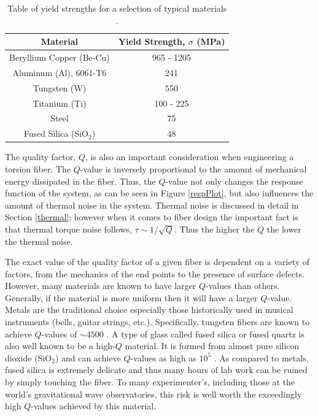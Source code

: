 \documentclass{book}
\begin{document}
\begin{center}		
	\begingroup
	\setlength{\tabcolsep}{10pt} %
	\renewcommand{\arraystretch}{1.5} %
	\begin{table}[ht!]
		\begin{center}
			\begin{tabular}{ |c|c| }
				\hline
				Material & Yield Strength, $\sigma$ (MPa) \\
				\hline
				Beryllium Copper (Be-Cu) & 965 - 1205 \\
				Aluminum (Al), 6061-T6 & 241\\
				Tungsten (W) & 550 \\ 
				Titanium (Ti) & 100 - 225\\
				Steel & 75\\
				Fused Silica (SiO$_2$) & 48\\
				\hline
				
			\end{tabular}
			\caption{Table of yield strengths for a selection of typical materials \cite{quartz, yield, alum, becu}.}\label{YieldTable}
		\end{center}
	\end{table}
	\endgroup
\end{center}

The quality factor, $Q$, is also an important consideration when engineering a torsion fiber. The $Q$-value is inversely proportional to the amount of mechanical energy dissipated in the fiber. Thus, the $Q$-value not only changes the response function of the system, as can be seen in Figure \ref{respPlot}, but also influences the amount of thermal noise in the system. Thermal noise is discussed in detail in Section \ref{thermal}; however when it comes to fiber design the important fact is that thermal torque noise follows, $\tau \sim 1/\sqrt{Q}$. Thus the higher the $Q$ the lower the thermal noise.

The exact value of the quality factor of a given fiber is dependent on a variety of factors, from the mechanics of the end points to the presence of surface defects. However, many materials are known to have larger $Q$-values than others. Generally, if the material is more uniform then it will have a larger $Q$-value. Metals are the traditional choice especially those historically used in musical instruments (bells, guitar strings, etc.). Specifically, tungsten fibers are known to achieve $Q$-values of $\sim4500$ \cite{qual}. A type of glass called fused silica or fused quartz is also well known to be a high-$Q$ material. It is formed from almost pure silicon dioxide (SiO$_2$) and can achieve $Q$-values as high as $10^5$ \cite{qual}. As compared to metals, fused silica is extremely delicate and thus many hours of lab work can be ruined by simply touching the fiber. To many experimenter's, including those at the world's gravitational wave observatories, this risk is well worth the exceedingly high $Q$-values achieved by this material.
\end{document}
